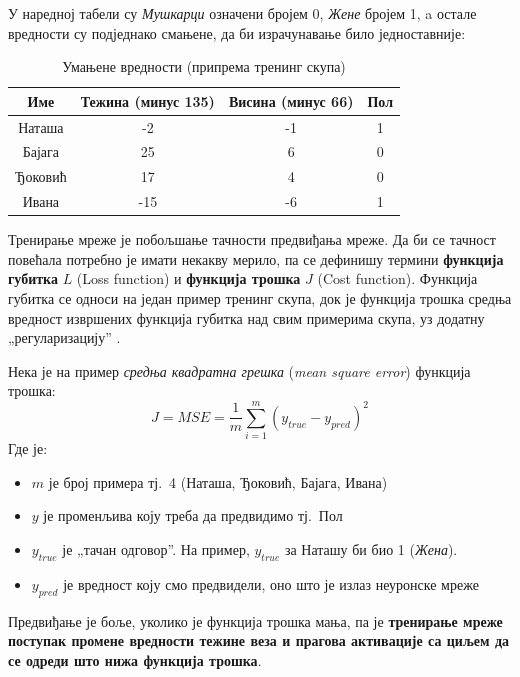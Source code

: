 \documentclass[12pt, а4paper]{article}
\begin{document}
У наредној табели су \textit{Мушкарци} означени бројем 0, \textit{Жене} бројем 1, a
остале вредности су подједнако смањене, да би израчунавање било једноставније:

\begin{table}[ht]
\centering
 \begin{tabular}{| c | c | c | c |}
  \hline
  Име & Тежина (минус 135) & Висина (минус 66) & Пол \\
  \hline
  Наташа & -2 & -1 & 1\\
  Бајага & 25 & 6 & 0\\
  Ђоковић & 17 & 4 & 0\\
  Ивана & -15 & -6 & 1\\
  \hline
 \end{tabular}
 \caption{Умањене вредности (припрема тренинг скупа)}
\end{table}


Тренирање мреже је побољшање тачности предвиђања мреже. Да би се тачност повећала потребно
је имати некакву мерило, па се
дефинишу термини \textbf{функција губитка} $L$ (Loss function) и
\textbf{функција трошка} $J$ (Cost function). Функција губитка се односи на један пример тренинг
скупа, док је функција трошка средња вредност извршених функција губитка над свим
примерима скупа, уз додатну „регуларизацију” \cite{stackex_loss}.

Нека је на пример \textit{средња квадратна грешка} (\textit{mean square error}) функција трошка:
\begin{equation}
J = MSE = \frac{1}{m} \sum_{i=1}^{m} (y_{true} - y_{pred})^2
\end{equation}
Где је:
\begin{itemize}
 \item $m$ је број примера тј.\ 4 (Наташа, Ђоковић, Бајага, Ивана)
 \item $y$ је променљива коју треба да предвидимо тј.\ Пол
 \item $y_{true}$ је „тачан одговор”. На пример, $y_{true}$ за Наташу би био 1 (\textit{Жена}).
 \item $y_{pred}$ је вредност коју смо предвидели, оно што је излаз неуронске мреже
\end{itemize}

Предвиђање је боље, уколико је функција трошка мања, па је
\textbf{тренирање мреже поступак промене вредности тежине веза и
прагова активације са циљем да се одреди што нижа функција трошка}.
\end{document}
